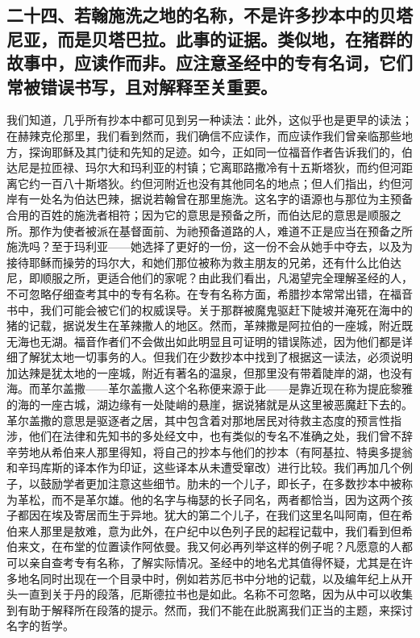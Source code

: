 
\subsection{二十四、若翰施洗之地的名称，不是许多抄本中的贝塔尼亚，而是贝塔巴拉。此事的证据。类似地，在猪群的故事中，应读作而非。应注意圣经中的专有名词，它们常被错误书写，且对解释至关重要。}

 我们知道，几乎所有抄本中都可见到另一种读法：此外，这似乎也是更早的读法；在赫辣克伦那里，我们看到然而，我们确信不应读作，而应读作我们曾亲临那些地方，探询耶稣及其门徒和先知的足迹。如今，正如同一位福音作者告诉我们的，伯达尼是拉匝禄、玛尔大和玛利亚的村镇；它离耶路撒冷有十五斯塔狄，而约但河距离它约一百八十斯塔狄。约但河附近也没有其他同名的地点；但人们指出，约但河岸有一处名为伯达巴辣，据说若翰曾在那里施洗。这名字的语源也与那位为主预备合用的百姓的施洗者相符；因为它的意思是预备之所，而伯达尼的意思是顺服之所。那作为使者被派在基督面前、为祂预备道路的人，难道不正是应当在预备之所施洗吗？至于玛利亚——她选择了更好的一份，这一份不会从她手中夺去，以及为接待耶稣而操劳的玛尔大，和她们那位被称为救主朋友的兄弟，还有什么比伯达尼，即顺服之所，更适合他们的家呢？由此我们看出，凡渴望完全理解圣经的人，不可忽略仔细查考其中的专有名称。在专有名称方面，希腊抄本常常出错，在福音书中，我们可能会被它们的权威误导。关于那群被魔鬼驱赶下陡坡并淹死在海中的猪的记载，据说发生在革辣撒人的地区。然而，革辣撒是阿拉伯的一座城，附近既无海也无湖。福音作者们不会做出如此明显且可证明的错误陈述，因为他们都是详细了解犹太地一切事务的人。但我们在少数抄本中找到了根据这一读法，必须说明加达辣是犹太地的一座城，附近有著名的温泉，但那里没有带着陡岸的湖，也没有海。而革尔盖撒——革尔盖撒人这个名称便来源于此——是靠近现在称为提庇黎雅的海的一座古城，湖边缘有一处陡峭的悬崖，据说猪就是从这里被恶魔赶下去的。革尔盖撒的意思是驱逐者之居，其中包含着对那地居民对待救主态度的预言性指涉，他们在法律和先知书的多处经文中，也有类似的专名不准确之处，我们曾不辞辛劳地从希伯来人那里得知，将自己的抄本与他们的抄本（有阿基拉、特奥多提翁和辛玛库斯的译本作为印证，这些译本从未遭受窜改）进行比较。我们再加几个例子，以鼓励学者更加注意这些细节。肋未的一个儿子，即长子，在多数抄本中被称为革松，而不是革尔雄。他的名字与梅瑟的长子同名，两者都恰当，因为这两个孩子都因在埃及寄居而生于异地。犹大的第二个儿子，在我们这里名叫阿南，但在希伯来人那里是敖难，意为此外，在户纪中以色列子民的起程记载中，我们看到但希伯来文，在布堂的位置读作阿依曼。我又何必再列举这样的例子呢？凡愿意的人都可以亲自查考专有名称，了解实际情况。圣经中的地名尤其值得怀疑，尤其是在许多地名同时出现在一个目录中时，例如若苏厄书中分地的记载，以及编年纪上从开头一直到关于丹的段落，厄斯德拉书也是如此。名称不可忽略，因为从中可以收集到有助于解释所在段落的提示。然而，我们不能在此脱离我们正当的主题，来探讨名字的哲学。\par

